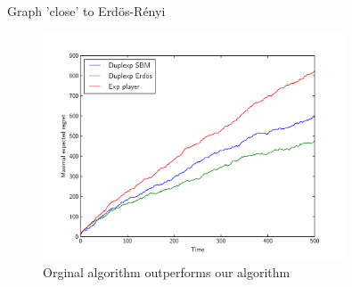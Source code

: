 \documentclass[11pt)]{beamer}
\begin{document}
\begin{frame}{Graph 'close' to Erdös-Rényi}

\begin{figure}[ht]
	\centering
	\includegraphics[width=0.8\textwidth]{easy}
	\caption{Orginal algorithm outperforms our algorithm}
	\label{fig:easy}
\end{figure}
\end{frame}
\end{document}
